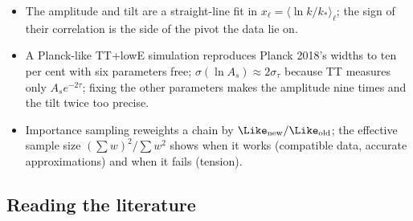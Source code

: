 \begin{recap}
\begin{itemize}[itemsep=1pt,leftmargin=1.2em]
        $\Delta\chi^2=\sum\frac\nu2[\delta C/(C+N)]^2\ll1$: first order for $(\ln A_s,n_s)$, second order for six parameters.
  \item The amplitude and tilt are a straight-line fit in $x_\ell=\langle\ln k/k_*\rangle_\ell$; the sign of their correlation is the
        side of the pivot the data lie on.
  \item A Planck-like TT+lowE simulation reproduces Planck 2018's widths to ten per cent with six parameters free;
        $\sigma(\ln A_s)\approx2\sigma_\tau$ because TT measures only $A_se^{-2\tau}$; fixing the other parameters makes the
        amplitude nine times and the tilt twice too precise.
  \item Importance sampling reweights a chain by $\Like_{\rm new}/\Like_{\rm old}$; the effective sample size
        $(\sum w)^2/\sum w^2$ shows when it works (compatible data, accurate approximations) and when it fails (tension).
\end{itemize}
\end{recap}

\subsection*{Reading the literature}
\label{9c:sec:reading-list}

